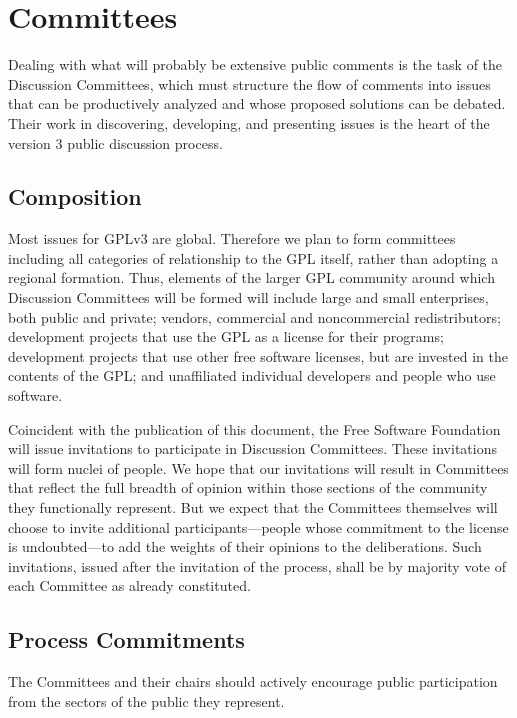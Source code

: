\chapter{Committees}


Dealing with what will probably be extensive public comments is the task
of the Discussion Committees, which must structure the flow of comments
into issues that can be productively analyzed and whose proposed solutions
can be debated. Their work in discovering, developing, and presenting
issues is the heart of the version 3 public discussion process.

\section{Composition}

Most issues for GPLv3 are global. Therefore we plan to form committees
including all categories of relationship to the GPL itself, rather than
adopting a regional formation. Thus, elements of the larger GPL community
around which Discussion Committees will be formed will include large
and small enterprises, both public and private; vendors, commercial and
noncommercial redistributors; development projects that use the GPL as
a license for their programs; development projects that use other free
software licenses, but are invested in the contents of the GPL; and
unaffiliated individual developers and people who use software.

Coincident with the publication of this document, the Free Software
Foundation will issue invitations to participate in Discussion Committees.
These invitations will form nuclei of people. We hope that our invitations
will result in Committees that reflect the full breadth of opinion within
those sections of the community they functionally represent. But we
expect that the Committees themselves will choose to invite additional
participants---people whose commitment to the license is undoubted---to
add the weights of their opinions to the deliberations. Such invitations,
issued after the invitation of the process, shall be by majority vote of
each Committee as already constituted.

\section{Process Commitments}

The Committees and their chairs should actively encourage public
participation from the sectors of the public they represent.

